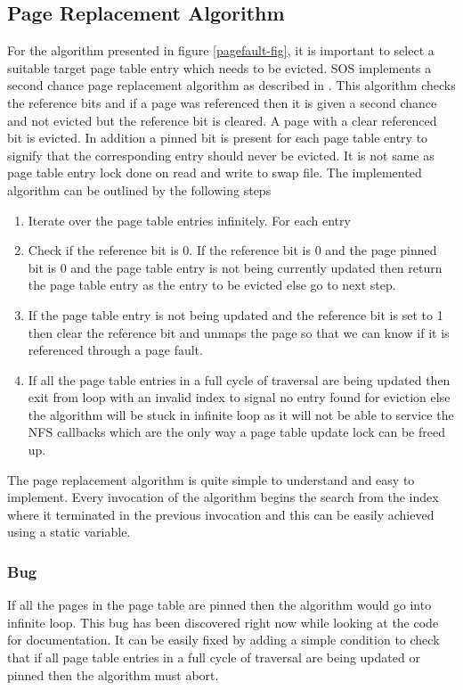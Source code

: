 \documentclass[a4paper, 11pt]{article}
\begin{document}
\subsection{Page Replacement Algorithm}
For the algorithm presented in figure \ref{pagefault-fig}, it is
important to select a suitable target page table entry which needs to
be evicted. SOS implements a second chance page replacement algorithm
as described in \cite[Page~399]{tanenbaum}. This algorithm checks the
reference bits and if a page was referenced then it is given a second
chance and not evicted but the reference bit is cleared. A page with a
clear referenced bit is evicted. In addition a pinned bit is present
for each page table entry to signify that the corresponding entry
should never be evicted. It is not same as page table entry lock done
on read and write to swap file. The implemented algorithm can be
outlined by the following steps
\begin{enumerate}
\item Iterate over the page table entries infinitely. For each entry
\item Check if the reference bit is 0. If the reference bit is 0 and
  the page pinned bit is 0 and the page table entry is not being
  currently updated then return the page table entry as the entry to
  be evicted else go to next step.
\item If the page table entry is not being updated and the reference
  bit is set to 1 then clear the reference bit and unmaps the page so
  that we can know if it is referenced through a page fault.
\item If all the page table entries in a full cycle of traversal are
  being updated then exit from loop with an invalid index to signal no
  entry found for eviction else the algorithm will be stuck in
  infinite loop as it will not be able to service the NFS callbacks
  which are the only way a page table update lock can be freed up.
\end{enumerate}
The page replacement algorithm is quite simple to understand and easy
to implement. Every invocation of the algorithm begins the search from
the index where it terminated in the previous invocation and this can
be easily achieved using a static variable.

\subsubsection{Bug}
If all the pages in the page table are pinned then the algorithm would
go into infinite loop. This bug has been discovered right now while
looking at the code for documentation. It can be easily fixed by
adding a simple condition to check that if all page table entries in a
full cycle of traversal are being updated or pinned then the algorithm
must abort.
\end{document}
